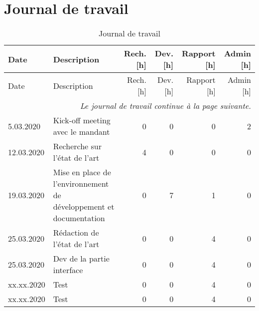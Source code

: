 

\chapter{Journal de travail}

\begin{landscape}

\begin{longtable}[c]{lp{10cm}rrrr}
    \caption{Journal de travail}\\

    \hline
    Date & Description & Rech. [h] & Dev. [h] & Rapport [h] & Admin [h] \\
    \hline
    \endfirsthead
    
    \hline
    Date & Description & Rech. [h] & Dev. [h] & Rapport [h] & Admin [h] \\
    \hline
    \endhead
    
    \multicolumn{6}{r}{\small \it Le journal de travail continue à la page suivante.} \\
    \normalsize
    \endfoot
    
    \hline
    \endlastfoot


	5.03.2020 
	& Kick-off meeting avec le mandant \lipsum[1-1]
	& 0 %
	& 0 %
	& 0 %
	& 2\\ %

	12.03.2020 
	& Recherche sur l'état de l'art
	& 4 %
	& 0 %
	& 0 %
	& 0\\ %

	19.03.2020 
	& Mise en place de l'environnement de développement et documentation
	& 0 %
	& 7 %
	& 1 %
	& 0\\ %

	25.03.2020 
	& Rédaction de l'état de l'art
	& 0 %
	& 0 %
	& 4 %
	& 0\\ %

	25.03.2020 
	& Dev de la partie interface
	& 0 %
	& 0 %
	& 4 %
	& 0\\ %
	
	
	xx.xx.2020 
	& Test
	& 0 %
	& 0 %
	& 4 %
	& 0\\ %
	
	xx.xx.2020 
	& Test
	& 0 %
	& 0 %
	& 4 %
	& 0\\ %


\end{longtable}
\end{landscape}
